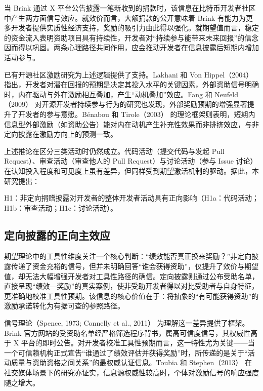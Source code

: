 \documentclass[
    type = master, %
    degree = professional,        %
    decl-page,  %
    twoside,                %
    fontset = fandol %
  ]{njuthesis}
\begin{document}
当 Brink 通过 X 平台公告披露一笔新收到的捐款时，该信息在比特币开发者社区中产生两方面信号效应。就效价而言，大额捐款的公开意味着 Brink 有能力为更多开发者提供实质性经济支持，奖励的吸引力由此得以强化。就期望值而言，稳定的资金流入表明资助项目具有持续性，开发者对“持续参与能带来未来回报”的信念因而得以巩固。两条心理路径共同作用，应会推动开发者在信息披露后短期内增加活动参与。

已有开源社区激励研究为上述逻辑提供了支持。Lakhani 和 Von Hippel（2004）\cite{lakhani2003open} 指出，开发者对潜在回报的预期是决定其投入水平的关键因素，外部资助信号明确时，内在驱动与外在激励相互叠加，产生“动机叠加”效应。Fang 和 Neufeld（2009）\cite{fang2009understanding} 对开源开发者持续参与行为的研究也发现，外部奖励预期的增强显著提升了开发者的参与意愿。B\'{e}nabou 和 Tirole（2003）\cite{benabou2003intrinsic} 的理论框架则表明，短期内信息型外部激励（如资助公告）能对内在动机产生补充性效果而非排挤效应，与非定向披露在激励方向上的预测一致。

上述推论在区分三类活动时仍然成立。代码活动（提交代码与发起 Pull Request）、审查活动（审查他人的 Pull Request）与讨论活动（参与 Issue 讨论）在认知投入程度和可见度上虽有差异，但同样受到期望激活机制的驱动。据此，本研究提出：

H1：非定向捐赠披露对开发者的整体开发者活动具有正向影响（H1a：代码活动；H1b：审查活动；H1c：讨论活动）。

\subsection{定向披露的正向主效应}

期望理论中的工具性维度关注一个核心判断：“绩效能否真正换来奖励？”非定向披露传递了资金充裕的信号，但并未明确回答“谁会获得资助”，仅提升了效价与期望值，却无法大幅增强开发者对工具性路径的确信。定向披露则通过公布受助名单，直接呈现“绩效—奖励”的真实案例，使非受助开发者得以对比受助者与自身特征，更准确地校准工具性预期。该信息的核心价值在于：将抽象的“有可能获得资助”的激励承诺转化为有据可查的参照路径。

信号理论（Spence, 1973; Connelly et al., 2011）\cite{spence1973job,connelly2011signaling} 为理解这一差异提供了框架。Brink 官方网站的受资助名单经严格筛选程序背书，属高可信度信号，其权威性高于 X 平台的即时公告。对开发者校准工具性预期而言，这一特性尤为关键——当一个可信赖机构正式宣告“谁通过了绩效评估并获得奖励”时，所传递的是关于“活动质量与资助资格之间关系”的最权威认证信息。Toubia 和 Stephen（2013）\cite{toubia2013intrinsic} 在社交媒体场景下的研究亦证实，信息源权威性较高时，个体对激励信号的响应强度随之增大。
\end{document}

